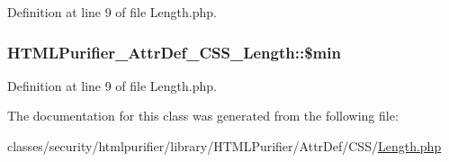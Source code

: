 Definition at line 9 of file Length.\+php.

\hypertarget{classHTMLPurifier__AttrDef__CSS__Length_ab132213a1ab8151d0c2df78a3c446240}{
\subsubsection[{\$min}]{\setlength{\rightskip}{0pt plus 5cm}H\+T\+M\+L\+Purifier\+\_\+\+Attr\+Def\+\_\+\+C\+S\+S\+\_\+\+Length\+::\$min\hspace{0.3cm}{\ttfamily [protected]}}}\label{classHTMLPurifier__AttrDef__CSS__Length_ab132213a1ab8151d0c2df78a3c446240}


Definition at line 9 of file Length.\+php.



The documentation for this class was generated from the following file\+:\begin{DoxyCompactItemize}
\item 
classes/security/htmlpurifier/library/\+H\+T\+M\+L\+Purifier/\+Attr\+Def/\+C\+S\+S/\hyperlink{AttrDef_2CSS_2Length_8php}{Length.\+php}\end{DoxyCompactItemize}
